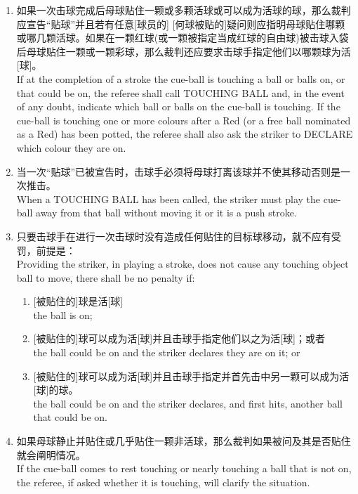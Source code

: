 \begin{enumerate}[label=(\alph*)]
    \item 如果一次击球完成后母球贴住一颗或多颗活球或可以成为活球的球，那么裁判应宣告``贴球''并且若有任意[球员的] [何球被贴的]疑问则应指明母球贴住哪颗或哪几颗活球。如果在一颗红球(或一颗被指定当成红球的自由球)被击球入袋后母球贴住一颗或一颗彩球，那么裁判还应要求击球手指定他们以哪颗球为活[球]。\\
    If at the completion of a stroke the cue-ball is touching a ball or balls on, or that could be on, the referee shall call TOUCHING BALL and, in the event of any doubt, indicate which ball or balls on the cue-ball is touching. If the cue-ball is touching one or more colours after a Red (or a free ball nominated as a Red) has been potted, the referee shall also ask the striker to DECLARE which colour they are on.
    \item 当一次``贴球''已被宣告时，击球手必须将母球打离该球并不使其移动否则是一次推击。\\
    When a TOUCHING BALL has been called, the striker must play the cue-ball away from that ball without moving it or it is a push stroke.
    \item 只要击球手在进行一次击球时没有造成任何贴住的目标球移动，就不应有受罚，前提是：\\
    Providing the striker, in playing a stroke, does not cause any touching object ball to move, there shall be no penalty if:
    \begin{enumerate}[label=(\roman*)]
        \item ${}$[被贴住的]球是活[球]\\
        the ball is on;
        \item ${}$[被贴住的]球可以成为活[球]并且击球手指定他们以之为活[球]；或者\\
        the ball could be on and the striker declares they are on it; or
        \item ${}$[被贴住的]球可以成为活[球]并且击球手指定并首先击中另一颗可以成为活[球]的球。\\
        the ball could be on and the striker declares, and first hits, another ball that could be on.
    \end{enumerate}
    \item 如果母球静止并贴住或几乎贴住一颗非活球，那么裁判如果被问及其是否贴住就会阐明情况。\\
    If the cue-ball comes to rest touching or nearly touching a ball that is not on, the referee, if asked whether it is touching, will clarify the situation.

\end{enumerate}
